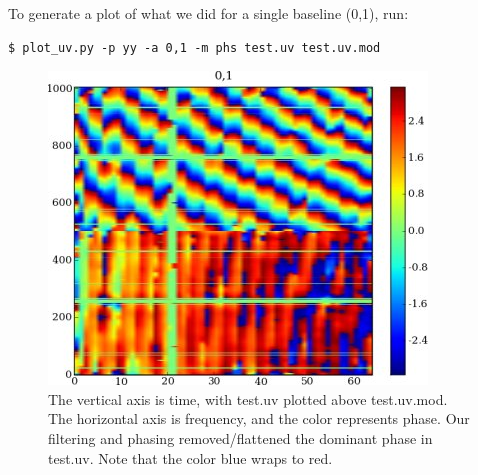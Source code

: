 To generate a plot of what we did for a single baseline (0,1), run:
\begin{verbatim}
$ plot_uv.py -p yy -a 0,1 -m phs test.uv test.uv.mod
\end{verbatim}

\begin{figure}
\begin{center}
\includegraphics[scale=.5]{plot_test_uv.jpg}
\caption{The vertical axis is time, with test.uv plotted above test.uv.mod.
The horizontal axis is frequency, and the color represents phase.  
Our filtering and phasing removed/flattened the dominant phase in test.uv.
Note that the color blue wraps to red.}
\end{center}
\end{figure}

